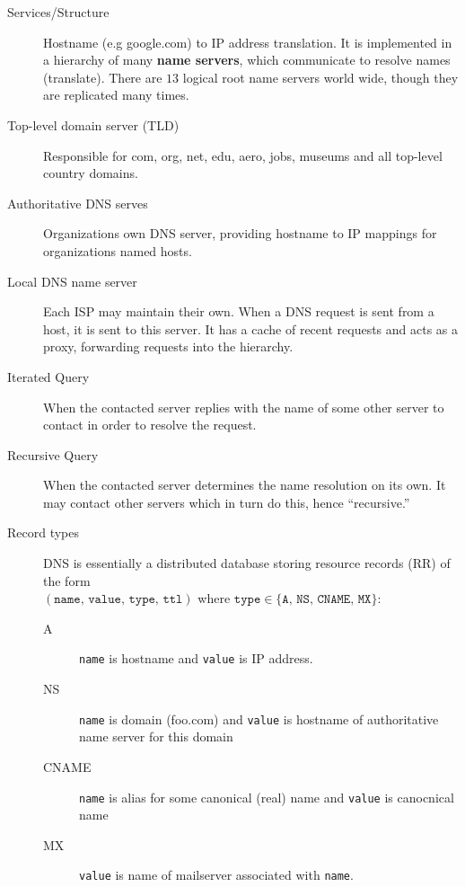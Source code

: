 \documentclass{article}
\begin{document}
\begin{description}
    \item[Services/Structure] Hostname (e.g google.com) to IP address translation. It is implemented
    in a hierarchy of many \textbf{name servers}, which communicate to resolve names (translate).
    There are $13$ logical root name servers world wide, though they are replicated many times.
    
    \item[Top-level domain server (TLD)] Responsible for com, org, net, edu, aero, jobs, museums and 
    all top-level country domains.
    
    \item[Authoritative DNS serves] Organizations own DNS server, providing hostname to IP mappings
    for organizations named hosts.
    
    \item[Local DNS name server] Each ISP may maintain their own. When a DNS request is sent from a 
    host, it is sent to this server. It has a cache of recent requests and acts as a proxy, forwarding
    requests into the hierarchy.
    
    \item[Iterated Query] When the contacted server replies with the name of some other server to 
    contact in order to resolve the request.
    
    \item[Recursive Query] When the contacted server determines the name resolution on its own. It 
    may contact other servers which in turn do this, hence ``recursive.''
    
    \item[Record types] DNS is essentially a distributed database storing resource records (RR) of 
    the form \\
    $(\texttt{name, value, type, ttl})$ where $\texttt{type}\in\{\texttt{A, NS, CNAME, 
    MX}\}$:
    \begin{description}
        \item[A] \texttt{name} is hostname and \texttt{value} is IP address.
        \item[NS] \texttt{name} is domain (foo.com) and \texttt{value} is hostname of authoritative
        name server for this domain
        \item[CNAME] \texttt{name} is alias for some canonical (real) name and \texttt{value} is 
        canocnical name
        \item[MX] \texttt{value} is name of mailserver associated with \texttt{name}.
    \end{description}
    

\end{description}
\end{document}
